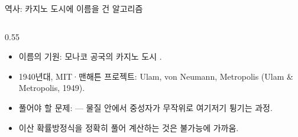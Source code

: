 \documentclass[aspectratio=169,11pt]{beamer}
\begin{document}
\begin{frame}{역사: 카지노 도시에 이름을 건 알고리즘}
  \begin{columns}[T]
    \begin{column}{0.55\textwidth}
      \begin{itemize}
        \item 이름의 기원: 모나코 공국의 카지노 도시
          .
        \item 1940년대, MIT·맨해튼 프로젝트: Ulam,
          von Neumann, Metropolis (Ulam \& Metropolis, 1949).
        \item 풀어야 할 문제:  --- 물질 안에서
          중성자가 무작위로 여기저기 튕기는 과정.
        \item 이산 확률방정식을 정확히 풀어 계산하는 것은
          불가능에 가까움.
      \end{itemize}
    \end{column}
  \end{columns}
\end{frame}
\end{document}
